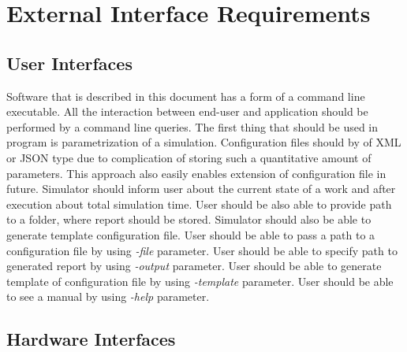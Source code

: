 
\chapter{External Interface Requirements} \label{chp:external-interface-requirements}

\section{User Interfaces}
	\begin{comment}
		$<$Describe the logical characteristics of each interface between the software 
		product and the users. This may include sample screen images, any GUI standards 
		or product family style guides that are to be followed, screen layout 
		constraints, standard buttons and functions (e.g., help) that will appear on 
		every screen, keyboard shortcuts, error message display standards, and so on.  
		Define the software components for which a user interface is needed. Details of 
		the user interface design should be documented in a separate user interface 
		specification.$>$
	\end{comment}
	Software that is described in this document has a form of a command line executable. All the interaction between end-user and application should be performed by a command line queries. The first thing that should be used in program is parametrization of a simulation. Configuration files should by of XML or JSON type due to complication of storing such a quantitative amount of parameters. This approach also easily enables extension of configuration file in future. Simulator should inform user about the current state of a work and after execution about total simulation time. User should be also able to provide path to a folder, where report should be stored. Simulator should also be able to generate template configuration file.
	{
		User should be able to pass a path to a configuration file by using \emph{-file} parameter.
	}
	{
		User should be able to specify path to generated report by using \emph{-output} parameter.
	}
	{
		User should be able to generate template of configuration file by using \emph{-template} parameter.
	}
	{
		User should be able to see a manual by using \emph{-help} parameter.
	}
\section{Hardware Interfaces}
	\begin{comment}
		$<$Describe the logical and physical characteristics of each interface between 
		the software product and the hardware components of the system. This may include 
		the supported device types, the nature of the data and control interactions 
		between the software and the hardware, and communication protocols to be 
		used.$>$
	\end{comment}


